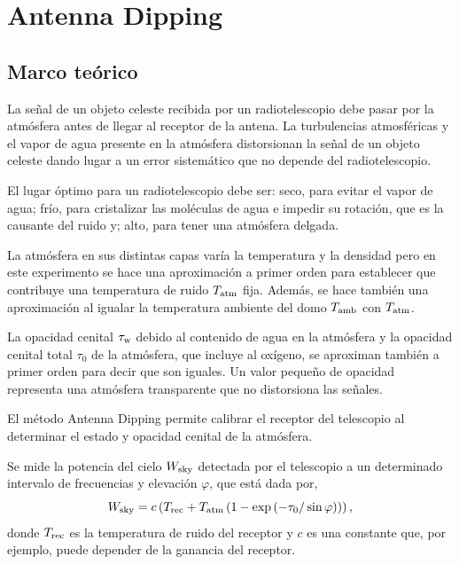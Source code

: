 \section{Antenna Dipping}\label{sec:antennadipping}

\subsection{Marco teórico}

La señal de un objeto celeste recibida por un radiotelescopio debe pasar por la atmósfera antes de llegar al receptor de la antena. La turbulencias atmosféricas y el vapor de agua presente en la atmósfera distorsionan la señal de un objeto celeste dando lugar a un error sistemático que no depende del radiotelescopio.

El lugar óptimo para un radiotelescopio debe ser: seco, para evitar el vapor de agua; frío, para cristalizar las moléculas de agua e impedir su rotación, que es la causante del ruido y; alto, para tener una atmósfera delgada.

La atmósfera en sus distintas capas varía la temperatura y la densidad pero en este experimento se hace una aproximación a primer orden para establecer que contribuye una temperatura de ruido $T_\textnormal{atm}$ fija. Además, se hace también una aproximación al igualar la temperatura ambiente del domo $T_\textnormal{amb}$ con $T_\textnormal{atm}$.

La opacidad cenital $\tau_\textnormal{w}$ debido al contenido de agua en la atmósfera y la opacidad cenital total $\tau_0$ de la atmósfera, que incluye al oxígeno, se aproximan también a primer orden para decir que son iguales. Un valor pequeño de opacidad representa una atmósfera transparente que no distorsiona las señales.

El método Antenna Dipping permite calibrar el receptor del telescopio al determinar el estado y opacidad cenital de la atmósfera.

Se mide la potencia del cielo $W_\textnormal{sky}$ detectada por el telescopio a un determinado intervalo de frecuencias y elevación $\varphi$, que está dada por,
\begin{equation}
W_\textnormal{sky}=c\left(T_\textnormal{rec}+T_\textnormal{atm}\left(1-\exp\left(-\tau_\textnormal{0}/\sin\varphi\right)\right)\right)
,\end{equation}
donde $T_\textnormal{rec}$ es la temperatura de ruido del receptor y $c$ es una constante que, por ejemplo, puede depender de la ganancia del receptor.

